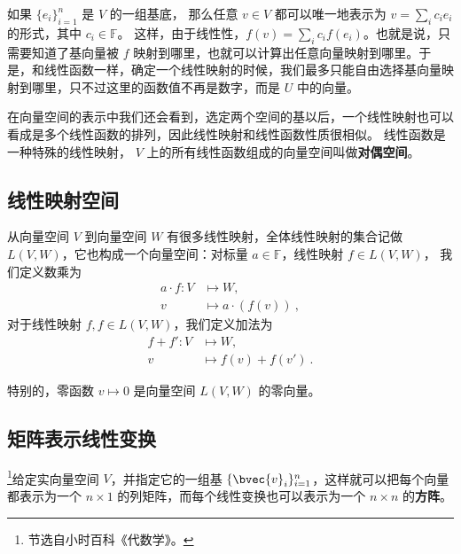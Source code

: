 如果 $\{{e}_i\}_{i=1}^n$ 是 $V$ 的一组基底， 那么任意 $v\in V$ 都可以唯一地表示为 $v=\sum_i c_i {e}_i$ 的形式，其中 $c_i\in\mathbb{F}$。 这样，由于线性性，$f(v)=\sum_ic_if({e}_i)$。也就是说，只需要知道了基向量被 $f$ 映射到哪里，也就可以计算出任意向量映射到哪里。于是，和线性函数一样，确定一个线性映射的时候，我们最多只能自由选择基向量映射到哪里，只不过这里的函数值不再是数字，而是 $U$ 中的向量。

在向量空间的表示中我们还会看到，选定两个空间的基以后，一个线性映射也可以看成是多个线性函数的排列，因此线性映射和线性函数性质很相似。 线性函数是一种特殊的线性映射， $V$ 上的所有线性函数组成的向量空间叫做\textbf{对偶空间}。

\subsection{线性映射空间}\label{sub_LinMap_1}

从向量空间 $V$ 到向量空间 $W$ 有很多线性映射，全体线性映射的集合记做 $L(V, W)$，它也构成一个向量空间：对标量 $a \in \mathbb{F}$，线性映射 $f \in L(V, W)$， 我们定义数乘为
\begin{equation}
\begin{aligned}
a \cdot f: V &\mapsto W, \\
v &\mapsto a \cdot (f(v))~,
\end{aligned}
\end{equation}
对于线性映射 $f, f \in L(V, W)$，我们定义加法为
\begin{equation}
\begin{aligned}
f + f': V &\mapsto W, \\
v &\mapsto f(v) + f(v')~.
\end{aligned}
\end{equation}

特别的，零函数 $v \mapsto 0$ 是向量空间 $L(V, W)$ 的零向量。


\subsection{矩阵表示线性变换}


\footnote{节选自小时百科《代数学》。}给定实向量空间 $V$，并指定它的一组基 $\{\bvec{v}_i\}_{i=1}^n$，这样就可以把每个向量都表示为一个 $n\times 1$ 的列矩阵，而每个线性变换也可以表示为一个 $n\times n$ 的\textbf{方阵}。

